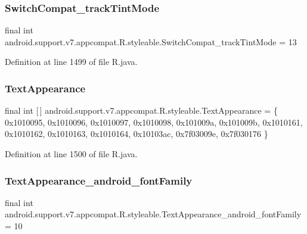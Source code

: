 \subsubsection{\texorpdfstring{SwitchCompat\_trackTintMode}{SwitchCompat\_trackTintMode}}
{\footnotesize\ttfamily final int android.\+support.\+v7.\+appcompat.\+R.\+styleable.\+Switch\+Compat\+\_\+track\+Tint\+Mode = 13\hspace{0.3cm}{\ttfamily [static]}}



Definition at line 1499 of file R.\+java.

\mbox{\label{classandroid_1_1support_1_1v7_1_1appcompat_1_1_r_1_1styleable_a85d64ca373dd3c60f50e0e9c1a55a8da}} 
\subsubsection{\texorpdfstring{TextAppearance}{TextAppearance}}
{\footnotesize\ttfamily final int \mbox{[}$\,$\mbox{]} android.\+support.\+v7.\+appcompat.\+R.\+styleable.\+Text\+Appearance = \{ 0x1010095, 0x1010096, 0x1010097, 0x1010098, 0x101009a, 0x101009b, 0x1010161, 0x1010162, 0x1010163, 0x1010164, 0x10103ac, 0x7f03009e, 0x7f030176 \}\hspace{0.3cm}{\ttfamily [static]}}



Definition at line 1500 of file R.\+java.

\mbox{\label{classandroid_1_1support_1_1v7_1_1appcompat_1_1_r_1_1styleable_a67396fb188140e0272669ea81f820da8}} 
\subsubsection{\texorpdfstring{TextAppearance\_android\_fontFamily}{TextAppearance\_android\_fontFamily}}
{\footnotesize\ttfamily final int android.\+support.\+v7.\+appcompat.\+R.\+styleable.\+Text\+Appearance\+\_\+android\+\_\+font\+Family = 10\hspace{0.3cm}{\ttfamily [static]}}



